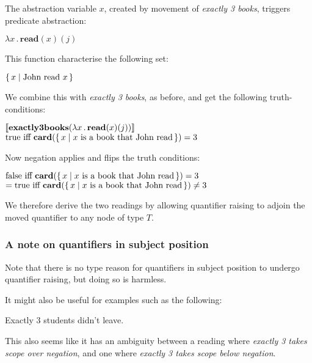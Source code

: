 \documentclass[letterpaper,parskip=half]{scrartcl}
\begin{document}
The abstraction variable \(x\), created by movement of \emph{exactly 3 books}, triggers predicate abstraction:

\begin{exe}
\ex \(\lambda x\,.\,\mathbf{read}(x)(j)\)
\end{exe}

This function characterise the following set:

\begin{exe}
\ex \(\set{x | \text{John read }x }\)
\label{org4028b59}
\end{exe}

We combine this with \emph{exactly 3 books}, as before, and get the following truth-conditions:

\begin{exe}
\ex \(\eval*{\mathbf{exactly3books}(\lambda x\,.\,\mathbf{read}(x)(j))}\)\\[0pt]
\(\text{true iff }\mathbf{card}(\set{x|x\text{ is a book that John read}}) = 3\)
\label{org2ccc2ed}
\end{exe}

Now negation applies and flips the truth conditions:

\begin{exe}
\ex \(\text{false iff }\mathbf{card}(\set{x|x\text{ is a book that John read}}) = 3\)\\[0pt]
\(= \text{true iff }\mathbf{card}(\set{x|x\text{ is a book that John read}}) \neq 3\)
\label{org550e689}
\end{exe}

We therefore derive the two readings by allowing quantifier raising to adjoin the moved quantifier to any node of type \(T\).

\subsubsection{A note on quantifiers in subject position}
\label{sec:org43ad983}

Note that there is no type reason for quantifiers in subject position to undergo quantifier raising, but doing so is harmless.

It might also be useful for examples such as the following:

\begin{exe}
\ex Exactly 3 students didn't leave.
\label{org120de71}
\end{exe}

This also seems like it has an ambiguity between a reading where \emph{exactly 3 takes scope over negation}, and one where \emph{exactly 3 takes scope below negation}.
\end{document}
